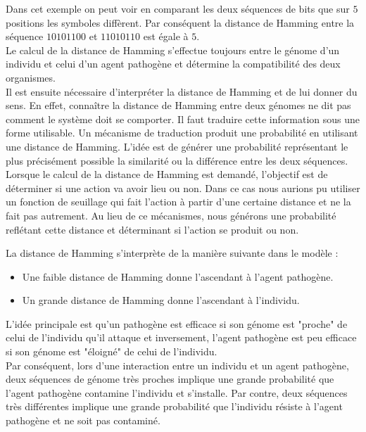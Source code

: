 Dans cet exemple on peut voir en comparant les deux séquences de bits que sur $5$ positions les symboles diffèrent. Par conséquent la distance de Hamming entre la séquence $10101100$ et $11010110$ est égale à $5$.\\

Le calcul de la distance de Hamming s'effectue toujours entre le génome d'un individu et celui d'un agent pathogène et détermine la compatibilité des deux organismes.\\

Il est ensuite nécessaire d'interpréter la distance de Hamming et de lui donner du sens. En effet, connaître la distance de Hamming entre deux génomes ne dit pas comment le système doit se comporter. Il faut traduire cette information sous une forme utilisable. Un mécanisme de traduction produit une probabilité en utilisant une distance de Hamming. L'idée est de générer une probabilité représentant le plus précisément possible la similarité ou la différence entre les deux séquences. Lorsque le calcul de la distance de Hamming est demandé, l'objectif est de déterminer si une action va avoir lieu ou non. Dans ce cas nous aurions pu utiliser un fonction de seuillage qui fait l'action à partir d'une certaine distance et ne la fait pas autrement. Au lieu de ce mécanismes, nous générons une probabilité reflétant cette distance et déterminant si l'action se produit ou non. 

La distance de Hamming s’interprète de la manière suivante dans le modèle :\\

\begin{itemize}
    \item Une faible distance de Hamming donne l'ascendant à l'agent pathogène.
    \item Un grande distance de Hamming donne l'ascendant à l'individu.
\end{itemize}

L'idée principale est qu'un pathogène est efficace si son génome est "proche" de celui de l'individu qu'il attaque et inversement, l'agent pathogène est peu efficace si son génome est "éloigné" de celui de l'individu.\\

Par conséquent, lors d'une interaction entre un individu et un agent pathogène, deux séquences de génome très proches implique une grande probabilité que l'agent pathogène contamine l'individu et s'installe. Par contre, deux séquences très différentes implique une grande probabilité que l'individu résiste à l'agent pathogène et ne soit pas contaminé.\\

